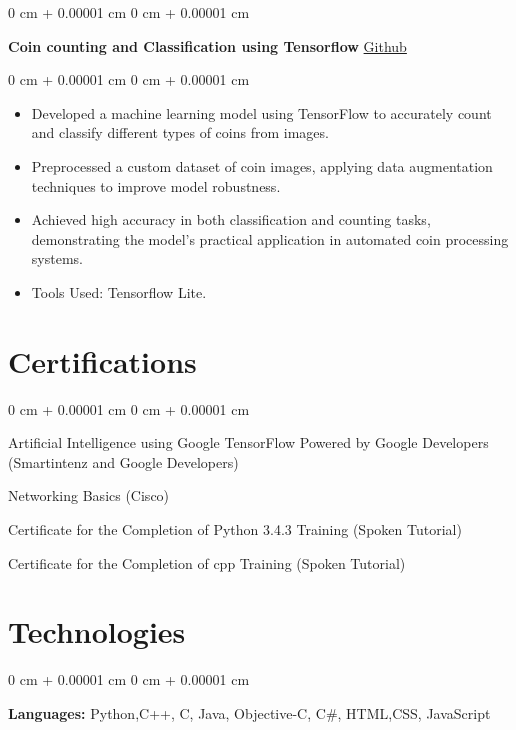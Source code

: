 \documentclass[10pt, letterpaper]{article}
\newenvironment{highlights}{
    \begin{itemize}[
        topsep=0.10 cm,
        parsep=0.10 cm,
        partopsep=0pt,
        itemsep=0pt,
        leftmargin=0 cm + 10pt
    ]
}{
    \end{itemize}
} %
\newenvironment{onecolentry}{
    \begin{adjustwidth}{
        0 cm + 0.00001 cm
    }{
        0 cm + 0.00001 cm
    }
}{
    \end{adjustwidth}
} %
\newenvironment{twocolentry}[2][]{
    \onecolentry
    \def\secondColumn{#2}
    \setcolumnwidth{\fill, 4.5 cm}
    \begin{paracol}{2}
}{
    \switchcolumn \raggedleft \secondColumn
    \end{paracol}
    \endonecolentry
} %
\begin{document}
        \vspace{0.2 cm}

        \begin{twocolentry}{
            \href{https://github.com/Itsmepranay/coin-counting-and-classification-using-tensorflow-lite}{Github}
        }
            \textbf{Coin counting and Classification using Tensorflow}\end{twocolentry}

        \vspace{0.10 cm}
        \begin{onecolentry}
            \begin{highlights}
                \item Developed a machine learning model using TensorFlow to accurately count and classify different types of coins from images.
                \item Preprocessed a custom dataset of coin images, applying data augmentation techniques to improve model robustness.
                \item Achieved high accuracy in both classification and counting tasks, demonstrating the model's practical application in automated coin processing systems.
                \item Tools Used: Tensorflow Lite.
            \end{highlights}
        \end{onecolentry}


        \vspace{0.2 cm}
    \section{Certifications}
        \begin{onecolentry}
            \item Artificial Intelligence using Google TensorFlow Powered by Google Developers (Smartintenz and Google Developers)
            \item Networking Basics (Cisco)
            \item Certificate for the Completion of Python 3.4.3 Training (Spoken Tutorial)
            \item Certificate for the Completion of cpp Training (Spoken Tutorial)
        \end{onecolentry}
    \section{Technologies}
        \begin{onecolentry}
            \textbf{Languages:} Python,C++, C, Java, Objective-C, C\#, HTML,CSS, JavaScript
        \end{onecolentry}

        


    
\end{document}
